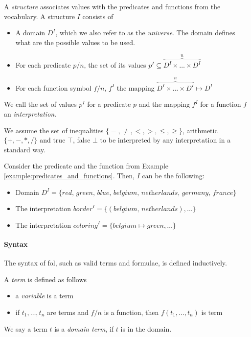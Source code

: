 A \textit{structure} associates values with the predicates and functions from the vocabulary. A structure $I$ consists of

\begin{itemize}
  \item A domain $D^I$, which we also refer to as the \textit{universe}. The domain defines what are the possible values to be used.
  \item For each predicate $p/n$, the set of its values $p^I \subseteq \overbrace{D^I \times \dots \times D^I}^{n}$
  \item For each function symbol $f/n$,  $f^I$ the mapping  $\overbrace{D^I \times \dots \times D^I}^{n} \mapsto D^I$
\end{itemize}
We call the set of values $p^I$ for a predicate $p$  and the mapping $f^I$ for a function $f$ an \textit{interpretation}.

We assume the set of inequalities $\{ =, \neq, <, >, \leq, \geq \}$,  arithmetic $\{+, -, *, / \}$ and true $\top$, false $\bot$ to be interpreted by any interpretation in a standard way.

\begin{example}
  Consider the predicate and the function from Example \ref{example:predicates_and_functions}. Then, $I$ can be the following:
  \begin{itemize}
    \item Domain $D^I = \{ \textit{red, green, blue, belgium, netherlands, germany, france} \}$
    \item The interpretation $\textit{border}^I = \{ (\textit{belgium, netherlands}), \dots \}$                                                                                     
    \item The interpretation $\textit{coloring}^I = \{ \textit{belgium} \mapsto \textit{green}, \dots \}$                                                                                     
  \end{itemize}
\end{example}


\paragraph{Syntax} 

The syntax of \acrlong{fol}, such as valid terms and formulae, is defined inductively.

A \textit{term} is defined as follows  
\begin{itemize}
  \item a \textit{variable} is a term
  \item if $t_1,\dots,t_n$ are terms and $f/n$ is a function, then $f(t_1,\dots,t_n)$ is term
\end{itemize}
We say a term $t$ is a \textit{domain term}, if $t$ is in the domain.



